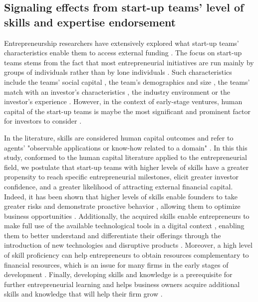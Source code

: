 \documentclass[12pt]{article}
\begin{document}
\subsection{Signaling effects from start-up teams' level of skills and expertise endorsement}

Entrepreneurship researchers have extensively explored what start-up teams' characteristics enable them to access external funding \citep{roure1990predictors}. The focus on start-up teams stems from the fact that most entrepreneurial initiatives are run mainly by groups of individuals rather than by lone individuals \citep{klotz2014new}. Such characteristics include the teams' social capital \citep{shane2002network}, the team's demographics and size \citep{eisenhardt1990organizational}, the teams' match with an investor's characteristics \citep{aggarwal2015evaluating}, the industry environment \citep{townsend2015turning} or the investor's experience \citep{franke2008venture}. However, in the context of early-stage ventures, human capital of the start-up teams is maybe the most significant and prominent factor for investors to consider \citep{beckman2007early, ko2018signaling, matusik2008values}.

In the literature, skills are considered human capital outcomes and refer to agents’ "observable applications or know-how related to a domain" \citep{becker1964human, marvel2016human}. In this this study, conformed to the human capital literature applied to the entrepreneurial field, we postulate that start-up teams with higher levels of skills have a greater propensity to reach specific entrepreneurial milestones, elicit greater investor confidence, and a greater likelihood of attracting external financial capital. Indeed, it has been shown that higher levels of skills enable founders to take greater risks and demonstrate proactive behavior \citep{becherer1999proactive}, allowing them to optimize business opportunities \citep{shane2000promise, chandler1994founder}. Additionally, the acquired skills enable entrepreneurs to make full use of the available technological tools in a digital context \citep{nambisan2017digital}, enabling them to better understand and differentiate their offerings through the introduction of new technologies and disruptive products \citep{marvel2007technology}. Moreover, a high level of skill proficiency can help entrepreneurs to obtain resources complementary to financial resources, which is an issue for many firms in the early stages of development \citep{beckman2007early}. Finally, developing skills and knowledge is a prerequisite for further entrepreneurial learning and helps business owners acquire additional skills and knowledge that will help their firm grow \citep{hunter1986cognitive}.
\end{document}
